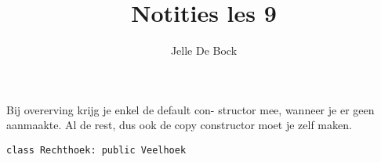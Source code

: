 \documentclass{article}
\title{Notities les 9}
\author{Jelle De Bock}
\begin{document}
\maketitle
Bij overerving krijg je enkel de default con-
structor mee, wanneer je er geen aanmaakte. Al de rest, dus ook de copy
constructor moet je zelf maken.
\begin{lstlisting}
class Rechthoek: public Veelhoek
\end{lstlisting}
\end{document}
